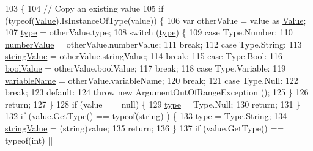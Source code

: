 \begin{DoxyCode}
103         \{
104             \textcolor{comment}{// Copy an existing value}
105             \textcolor{keywordflow}{if} (typeof(\hyperlink{a00100_a7d2db75682c57463bf43c13499991ad4}{Value}).IsInstanceOfType(value)) \{
106                 var otherValue = value as \hyperlink{a00100_a7d2db75682c57463bf43c13499991ad4}{Value};
107                 \hyperlink{a00100_a6d5820fafa766911b9da84d1ed33e51a}{type} = otherValue.type;
108                 \textcolor{keywordflow}{switch} (\hyperlink{a00100_a6d5820fafa766911b9da84d1ed33e51a}{type}) \{
109                 \textcolor{keywordflow}{case} Type.Number:
110                     \hyperlink{a00100_ae1892c1c7a8177537d1caa39a2e51da6}{numberValue} = otherValue.numberValue;
111                     \textcolor{keywordflow}{break};
112                 \textcolor{keywordflow}{case} Type.String:
113                     \hyperlink{a00100_add1b07146f1a9e4b655b33c93d07dff9}{stringValue} = otherValue.stringValue;
114                     \textcolor{keywordflow}{break};
115                 \textcolor{keywordflow}{case} Type.Bool:
116                     \hyperlink{a00100_acb140e3466e132528409d4c441fd67da}{boolValue} = otherValue.boolValue;
117                     \textcolor{keywordflow}{break};
118                 \textcolor{keywordflow}{case} Type.Variable:
119                     \hyperlink{a00100_a8ee2b09b7d28eaf97bf63c74d0023bfd}{variableName} = otherValue.variableName;
120                     \textcolor{keywordflow}{break};
121                 \textcolor{keywordflow}{case} Type.Null:
122                     \textcolor{keywordflow}{break};
123                 \textcolor{keywordflow}{default}:
124                     \textcolor{keywordflow}{throw} \textcolor{keyword}{new} ArgumentOutOfRangeException ();
125                 \}
126                 \textcolor{keywordflow}{return};
127             \}
128             \textcolor{keywordflow}{if} (value == null) \{
129                 \hyperlink{a00100_a6d5820fafa766911b9da84d1ed33e51a}{type} = Type.Null;
130                 \textcolor{keywordflow}{return};
131             \}
132             \textcolor{keywordflow}{if} (value.GetType() == typeof(\textcolor{keywordtype}{string}) ) \{
133                 \hyperlink{a00100_a6d5820fafa766911b9da84d1ed33e51a}{type} = Type.String;
134                 \hyperlink{a00100_add1b07146f1a9e4b655b33c93d07dff9}{stringValue} = (string)value;
135                 \textcolor{keywordflow}{return};
136             \}
137             \textcolor{keywordflow}{if} (value.GetType() == typeof(\textcolor{keywordtype}{int}) ||

\end{DoxyCode}
